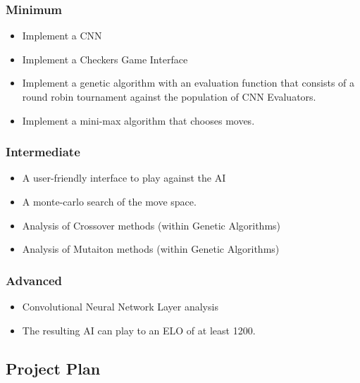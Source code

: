 \hypertarget{minimum}{%
\subsubsection{Minimum}\label{minimum}}

\begin{itemize}
\tightlist
\item
  Implement a CNN
\item
  Implement a Checkers Game Interface
\item
  Implement a genetic algorithm with an evaluation function that
  consists of a round robin tournament against the population of CNN
  Evaluators.
\item
  Implement a mini-max algorithm that chooses moves.
\end{itemize}

\hypertarget{intermediate}{%
\subsubsection{Intermediate}\label{intermediate}}

\begin{itemize}
\tightlist
\item
  A user-friendly interface to play against the AI
\item
  A monte-carlo search of the move space.
\item
  Analysis of Crossover methods (within Genetic Algorithms)
\item
  Analysis of Mutaiton methods (within Genetic Algorithms)
\end{itemize}

\hypertarget{advanced}{%
\subsubsection{Advanced}\label{advanced}}

\begin{itemize}
\tightlist
\item
  Convolutional Neural Network Layer analysis
\item
  The resulting AI can play to an ELO of at least 1200.
\end{itemize}

\hypertarget{project-plan-1}{%
\subsection{Project Plan}\label{project-plan-1}}

